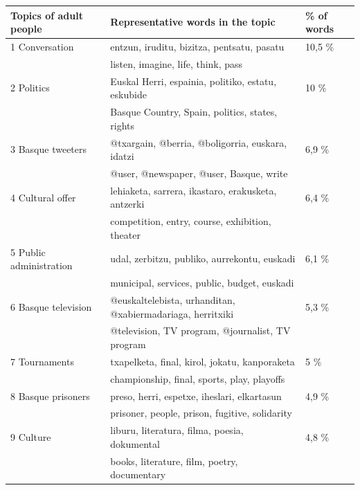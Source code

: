 \documentclass[information,article,submit,moreauthors,pdftex,10pt,a4paper]{Definitions/mdpi}
\begin{document}
\begin{table}[H]
  \centering
  \begin{tabular}{|l|l|l|}
    \hline
    \textbf{Topics of adult people} &  \textbf{Representative words in the topic} & \textbf{\% of words} \\ \hline
                   1  Conversation & entzun, iruditu, bizitza, pentsatu, pasatu & 10,5 \%  \\ \hline
                   & listen, imagine, life, think, pass & \\ \hline
                   2  Politics & Euskal Herri, espainia, politiko, estatu, eskubide & 10 \%  \\ \hline
                   & Basque Country, Spain, politics, states, rights & \\ \hline
                   3  Basque tweeters & @txargain, @berria, @boligorria, euskara, idatzi & 6,9 \%  \\ \hline
                   & @user, @newspaper, @user, Basque, write & \\ \hline
                   4  Cultural offer & lehiaketa, sarrera, ikastaro, erakusketa, antzerki & 6,4 \%  \\ \hline
                   & competition, entry, course, exhibition, theater & \\ \hline
                   5  Public administration & udal, zerbitzu, publiko, aurrekontu, euskadi & 6,1 \%  \\ \hline
                   & municipal, services, public, budget, euskadi & \\ \hline
                   6  Basque television & @euskaltelebista, urhanditan, @xabiermadariaga, herritxiki & 5,3 \%  \\ \hline
                   & @television, TV program, @journalist, TV program & \\ \hline
                   7  Tournaments & txapelketa, final, kirol, jokatu, kanporaketa & 5 \%  \\ \hline
                   & championship, final, sports, play, playoffs & \\ \hline
                   8  Basque prisoners & preso, herri, espetxe, iheslari, elkartasun & 4,9 \%  \\ \hline
                   & prisoner, people, prison, fugitive, solidarity & \\ \hline
                   9  Culture & liburu, literatura, filma, poesia, dokumental & 4,8 \%  \\ \hline
                   & books, literature, film, poetry, documentary & \\ \hline

\end{tabular}
\end{table}
\end{document}
